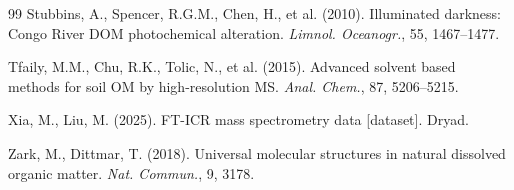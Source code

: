 \documentclass[12pt,letterpaper]{article}
\begin{document}
\begin{thebibliography}{99}
Stubbins, A., Spencer, R.G.M., Chen, H., et al. (2010).
Illuminated darkness: Congo River DOM photochemical alteration.
\textit{Limnol. Oceanogr.}, 55, 1467--1477.

Tfaily, M.M., Chu, R.K., Tolic, N., et al. (2015).
Advanced solvent based methods for soil OM by high-resolution MS.
\textit{Anal. Chem.}, 87, 5206--5215.

Xia, M., Liu, M. (2025).
FT-ICR mass spectrometry data [dataset]. Dryad.

Zark, M., Dittmar, T. (2018).
Universal molecular structures in natural dissolved organic matter.
\textit{Nat. Commun.}, 9, 3178.

\end{thebibliography}
\end{document}
